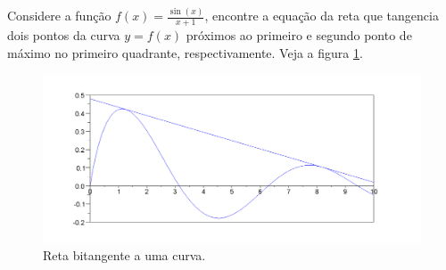 \begin{exer}\label{prob_bitang}Considere a função $f(x)=\frac{\sin(x)}{x+1}$, encontre a equação da reta que tangencia dois pontos da curva $y=f(x)$ próximos ao primeiro e segundo ponto de máximo no primeiro quadrante, respectivamente. Veja a figura \ref{pic:bitang}.
\end{exer}
\begin{figure}
        \centering
	    \includegraphics[width=\textwidth]{cap_nlinsis/pics/curva_Q23}
		\caption{Reta bitangente a uma curva.}
		\label{pic:bitang}
	\end{figure}

